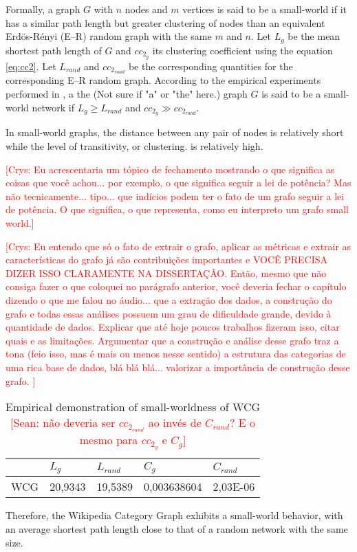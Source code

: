 Formally, a graph $G$ with $n$ nodes and $m$ vertices is said to be a small-world if it has a similar path length but greater clustering of nodes than an equivalent Erdös-Rényi (E–R) random graph with the same $m$ and $n$. Let $L_g$ be the mean shortest path length of $G$ and $cc_{2_g}$ its clustering coefficient using the equation \ref{eq:cc2}. Let $L_{rand}$ and  $cc_{2_{rand}}$ be the corresponding quantities for the corresponding E–R random graph. According to the empirical experiments performed in \cite{watts1998collective}, a the (Not sure if "a" or "the" here.) graph $G$ is said to be a small-world network if
$L_g \ge L_{rand}$ and $ cc_{2_g} \gg cc_{2_{rand}}$.

In small-world graphs, the distance between any pair of nodes is relatively short while the level of transitivity, or clustering. is relatively high.

\textcolor{red}{[Crys: Eu acrescentaria um tópico de fechamento mostrando o que significa as coisas que você achou... por exemplo, o que significa seguir a lei de potência? Mas não tecnicamente... tipo... que indícios podem ter o fato de um grafo seguir a lei de potência. O que significa, o que representa, como eu interpreto um grafo small world.]}

\textcolor{red}{[Crys: Eu entendo que só o fato de extrair o grafo, aplicar as métricas e extrair as características do grafo já são contribuições importantes e VOCÊ PRECISA DIZER ISSO CLARAMENTE NA DISSERTAÇÃO. Então, mesmo que não consiga fazer o que coloquei no parágrafo anterior, você deveria fechar o capítulo dizendo o que me falou no áudio... que a extração dos dados, a construção do grafo e todas essas análises possuem um grau de dificuldade grande, devido à quantidade de dados. Explicar que até hoje poucos trabalhos fizeram isso, citar quais e as limitações. Argumentar que a construção e análise desse grafo traz a tona (feio isso, mas é mais ou menos nesse sentido) a estrutura das categorias de uma rica base de dados, blá blá blá... valorizar a importância de construção desse grafo. ]}




\begin{table}[!h]
\centering
\begin{tabular}{@{}lllll@{}}
\toprule
    & $L_g$       & $L_{rand}$       & $C_g$           & $C_{rand}$        \\ \midrule
WCG & 20,9343 & 19,5389 & 0,003638604 & 2,03E-06 \\ \bottomrule
\end{tabular}
\caption{Empirical demonstration of small-worldness of WCG \textcolor{red}{[Sean: não deveria ser $cc_{2_{rand}}$ ao invés de $C_{rand}$? E o mesmo para $cc_{2_{g}}$ e $C_{g}$]}}
\label{small-worldness}
\end{table}

Therefore, the Wikipedia Category Graph exhibits a small-world behavior, with an average shortest path length close to that of a random network with the same size.